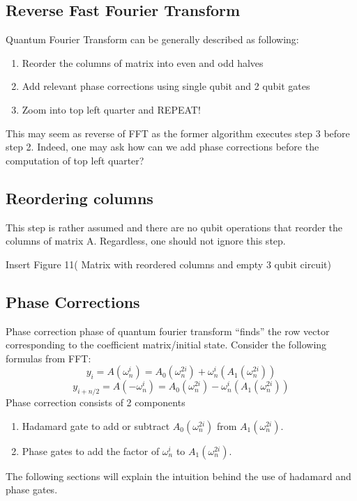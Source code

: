 \documentclass{article}
\newcommand{\om}{\omega_n}
\begin{document}
    \subsection{Reverse Fast Fourier Transform}
    Quantum Fourier Transform can be generally described as following:
    \begin{enumerate}
      \item Reorder the columns of matrix into even and odd halves
      \item Add relevant phase corrections using single qubit and 2 qubit gates
      \item Zoom into top left quarter and REPEAT!
    \end{enumerate}
    This may seem as reverse of FFT as the former algorithm executes step 3 before
    step 2. Indeed, one may ask how can we add phase corrections before the
    computation of top left quarter?


    \subsection{Reordering columns}
    This step is rather assumed and there are no qubit operations that reorder
    the columns of matrix A. Regardless, one should not ignore this step.

    Insert Figure 11( Matrix with reordered columns and empty 3 qubit circuit)
    \subsection{Phase Corrections}
    Phase correction phase of quantum fourier transform ``finds'' the row
    vector corresponding to the coefficient matrix/initial state.
    Consider the following formulas from FFT:
    \[ y_{i} = A(\om^{i}) = A_0(\om^{2i}) +\om^i(A_1(\om^{2i})) \]
    \[ y_{i+n/2}= A(-\om^{i}) = A_0(\om^{2i}) -\om^i(A_1(\om^{2i})) \]
    Phase correction consists of 2 components
    \begin{enumerate}
      \item Hadamard gate to add or subtract \(A_0(\om^{2i})\) from
      \(A_1(\om^{2i})\).
      \item Phase gates to add the factor of \(\om^i\) to \(A_1(\om^{2i})\).
    \end{enumerate}
    The following sections will explain the intuition behind the use of
    hadamard and phase gates.
\end{document}
